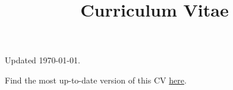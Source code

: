 \documentclass[a4paper,skipsamekey,11pt,english]{curve}
\title{Curriculum Vitae}
\begin{document}
\makeheaders[c]


\pagestyle{fancy}
    \renewcommand{\headrulewidth}{0pt}
    \fancyhead{} %
    \fancyfoot{} %
    \fancyfoot[C]{\thepage}
\thispagestyle{empty}








% 

\vfill
\begin{center}
Updated \today.
\par Find the most up-to-date version of this CV {\textcolor{MarkerColour}{\scriptsize\faLink}}\href{https://raw.githubusercontent.com/dgianotti/CV/master/DJSG-CV.pdf}{\textcolor{MarkerColour}{here}}.
\end{center}
\end{document}
